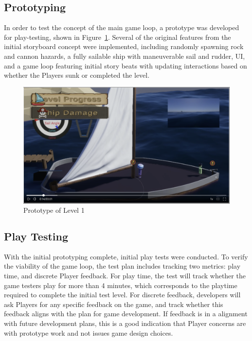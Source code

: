 \subsection{Prototyping}
In order to test the concept of the main game loop, a prototype was developed
for play-testing, shown in Figure~\ref{fig:prototype}. Several of the original
features from the initial storyboard concept were implemented, including
randomly spawning rock and cannon hazards, a fully sailable ship with
maneuverable sail and rudder, \ac{UI}, and a game loop featuring initial story
beats with updating interactions based on whether the Players sunk or completed
the level.

\begin{figure}[htbp]
    \centerline{\includegraphics[scale=0.09]{figures/prototype.png}}
    \caption{Prototype of Level 1}
    \label{fig:prototype}
\end{figure}

\subsection{Play Testing}
With the initial prototyping complete, initial play tests were conducted. To
verify the viability of the game loop, the test plan includes tracking two
metrics: play time, and discrete Player feedback. For play time, the test will
track whether the game testers play for more than 4 minutes, which corresponds
to the playtime required to complete the initial test level. For discrete
feedback, developers will ask Players for any specific feedback on the game,
and track whether this feedback aligns with the plan for game development. If
feedback is in a alignment with future development plans, this is a good
indication that Player concerns are with prototype work and not issues game
design choices.
